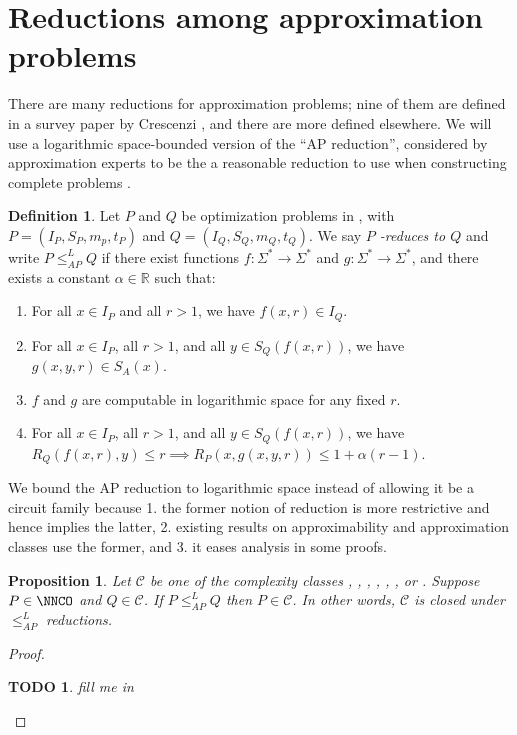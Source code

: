 \documentclass[]{article}
\theoremstyle{plain}
\newtheorem{proposition}{Proposition}
\newtheorem{todo}{TODO}
\theoremstyle{definition}
\newtheorem{definition}{Definition}
\newcommand{\APr}{\leq_{AP}^{L}}
\begin{document}
\section{Reductions among approximation problems}

There are many reductions for approximation problems; nine of them are defined in a survey paper by Crescenzi \cite{crescenzi97}, and there are more defined elsewhere.
We will use a logarithmic space-bounded version of the ``AP reduction'', considered by approximation experts to be the a reasonable reduction to use when constructing complete problems \cite[Section~2]{crescenzi97} \cite[Section~8.6]{acgkmp99}.

\begin{definition}{\cite[Definition~9]{ckst95}}
  Let $P$ and $Q$ be optimization problems in \NNCO, with $P=(I_P, S_P, m_p, t_P)$ and $Q=(I_Q, S_Q, m_Q, t_Q)$.
  We say \emph{$P$ \PTAS-reduces to $Q$} and write $P\APr Q$ if there exist functions $f\colon\Sigma^*\to\Sigma^*$ and $g\colon\Sigma^*\to\Sigma^*$, and there exists a constant $\alpha\in\mathbb{R}$ such that:
  \begin{enumerate}
  \item For all $x\in I_P$ and all $r > 1$, we have $f(x, r)\in I_Q$.
  \item For all $x\in I_P$, all $r > 1$, and all $y\in S_Q(f(x, r))$, we have $g(x, y, r)\in S_A(x)$.
  \item $f$ and $g$ are computable in logarithmic space for any fixed $r$.
  \item For all $x\in I_P$, all $r > 1$, and all $y\in S_Q(f(x, r))$, we have $R_Q(f(x, r), y) \leq r \implies R_P(x, g(x, y, r)) \leq 1 + \alpha(r - 1)$.
  \end{enumerate}
\end{definition}

We bound the AP reduction to logarithmic space instead of allowing it be a \FNC{} circuit family because 1. the former notion of reduction is more restrictive and hence implies the latter, 2. existing results on approximability and approximation classes use the former, and 3. it eases analysis in some proofs.

\begin{proposition}
  Let $\mathcal{C}$ be one of the complexity classes \NCO, \NCAS, \ApxNCO, \logApxNCO, \polyApxNCO, \expApxNCO, or \NNCO.
  Suppose $P\in\NNCO$ and $Q\in\mathcal{C}$.
  If $P\APr Q$ then $P\in \mathcal{C}$.
  In other words, $\mathcal{C}$ is closed under $\APr$ reductions.
\end{proposition}
\begin{proof}
  \begin{todo}
    fill me in
  \end{todo}
\end{proof}
\end{document}
